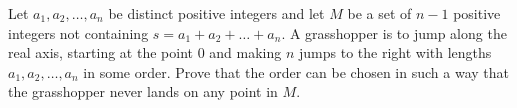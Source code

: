 Let $ a_1, a_2, \ldots , a_n$ be distinct positive integers and let $ M$ be a set of $ n - 1$ positive integers not containing $ s = a_1 + a_2 + \ldots + a_n.$ A grasshopper is to jump along the real axis, starting at the point $ 0$ and making $ n$ jumps to the right with lengths $ a_1, a_2, \ldots , a_n$ in some order. Prove that the order can be chosen in such a way that the grasshopper never lands on any point in $ M.$